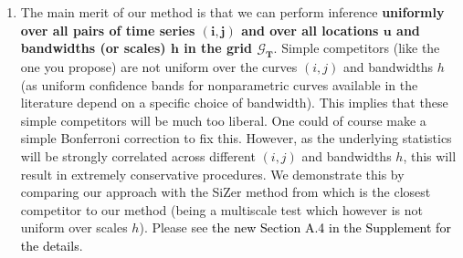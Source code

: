 \documentclass[a4paper,12pt]{article}
\newcommand{\reference}[1]{\textcolor{black}{#1}}
\begin{document}
\begin{enumerate}[label=\arabic*.,leftmargin=0.6cm]
\begin{enumerate}[label=(\roman*),leftmargin=0.75cm,topsep=0pt]

\item %
The main merit of our method is that we can perform inference \textbf{uniformly over all pairs of time series $\boldsymbol{(i,j)}$ and over all locations $\boldsymbol{u}$ and bandwidths (or scales) $\boldsymbol{h}$ in the grid $\boldsymbol{\mathcal{G}_T}$}. Simple competitors (like the one you propose) are not uniform over the curves $(i,j)$ and bandwidths $h$ (as uniform confidence bands for nonparametric curves available in the literature depend on a specific choice of bandwidth). This implies that these simple competitors will be much too liberal. One could of course make a simple Bonferroni correction to fix this. However, as the underlying statistics will be strongly correlated across different $(i,j)$ and bandwidths $h$, this will result in extremely conservative procedures. We demonstrate this by comparing our approach with the SiZer method from \cite{Park2009} which is the closest competitor to our method (being a multiscale test which however is not uniform over scales $h$). Please see \reference{the new Section A.4 in the Supplement for the details}. 


\end{enumerate}
\end{enumerate}
\end{document}
